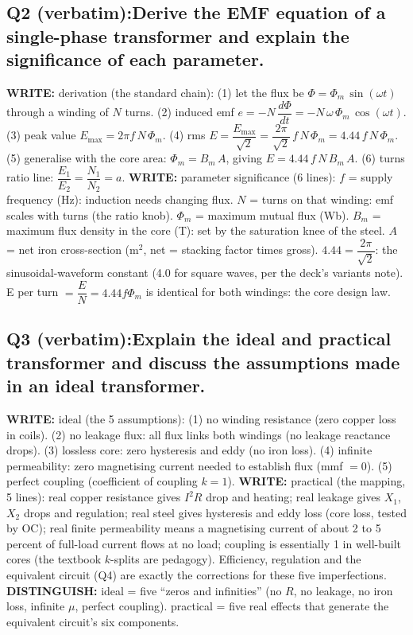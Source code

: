 \documentclass[11pt]{article}
\newcommand{\q}[2]{\subsection*{\color{copper}#1\quad\color{iron}#2}}
\newcommand{\w}[1]{\textbf{\color{copper}WRITE:} #1}
\newcommand{\kd}[1]{\textbf{\color{red}DISTINGUISH:} #1}
\begin{document}
\q{Q2 (verbatim):}{Derive the EMF equation of a single-phase transformer and explain the significance of each parameter.}
\w{derivation (the standard chain):} (1) let the flux be $\Phi = \Phi_m\, \sin(\omega t)$ through a winding of $N$ turns. (2) induced emf $e = -N\,\dfrac{d\Phi}{dt} = -N\, \omega\, \Phi_m\, \cos(\omega t)$. (3) peak value $E_{\text{max}} = 2\pi f\, N\, \Phi_m$. (4) rms $E = \dfrac{E_{\text{max}}}{\sqrt{2}} = \dfrac{2\pi}{\sqrt{2}}\, f\, N\, \Phi_m = 4.44\, f\, N\, \Phi_m$. (5) generalise with the core area: $\Phi_m = B_m\, A$, giving $\boxed{E = 4.44\, f\, N\, B_m\, A}$. (6) turns ratio line: $\dfrac{E_1}{E_2} = \dfrac{N_1}{N_2} = a$.
\w{parameter significance (6 lines):} $f$ = supply frequency (Hz): induction needs changing flux. $N$ = turns on that winding: emf scales with turns (the ratio knob). $\Phi_m$ = maximum mutual flux (Wb). $B_m$ = maximum flux density in the core (T): set by the saturation knee of the steel. $A$ = net iron cross-section ($\text{m}^{2}$, net = stacking factor times gross). $4.44 = \dfrac{2\pi}{\sqrt{2}}$: the sinusoidal-waveform constant (4.0 for square waves, per the deck's variants note). E per turn $= \dfrac{E}{N} = 4.44 f \Phi_m$ is identical for both windings: the core design law.

\q{Q3 (verbatim):}{Explain the ideal and practical transformer and discuss the assumptions made in an ideal transformer.}
\w{ideal (the 5 assumptions):} (1) no winding resistance (zero copper loss in coils). (2) no leakage flux: all flux links both windings (no leakage reactance drops). (3) lossless core: zero hysteresis and eddy (no iron loss). (4) infinite permeability: zero magnetising current needed to establish flux (mmf $= 0$). (5) perfect coupling (coefficient of coupling $k = 1$).
\w{practical (the mapping, 5 lines):} real copper resistance gives $I^{2}R$ drop and heating; real leakage gives $X_1$, $X_2$ drops and regulation; real steel gives hysteresis and eddy loss (core loss, tested by OC); real finite permeability means a magnetising current of about 2 to 5 percent of full-load current flows at no load; coupling is essentially 1 in well-built cores (the textbook $k$-splits are pedagogy). Efficiency, regulation and the equivalent circuit (Q4) are exactly the corrections for these five imperfections.
\kd{ideal = five ``zeros and infinities'' (no $R$, no leakage, no iron loss, infinite $\mu$, perfect coupling). practical = five real effects that generate the equivalent circuit's six components.}
\end{document}
